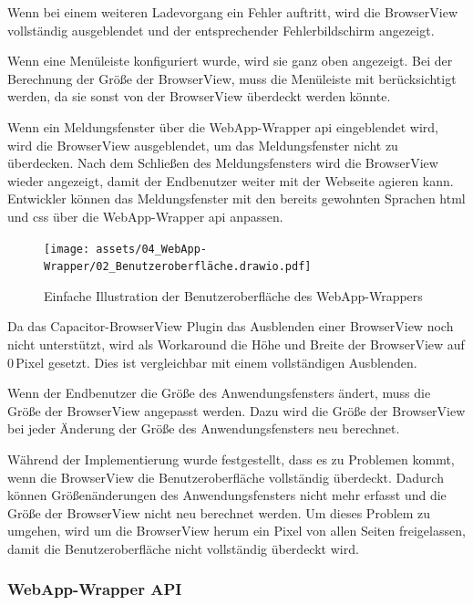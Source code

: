 Wenn bei einem weiteren Ladevorgang ein Fehler auftritt, wird die BrowserView vollständig ausgeblendet und der entsprechender Fehlerbildschirm angezeigt.

Wenn eine Menüleiste konfiguriert wurde, wird sie ganz oben angezeigt.
Bei der Berechnung der Größe der BrowserView, muss die Menüleiste mit berücksichtigt werden, da sie sonst von der BrowserView überdeckt werden könnte.

\newpage

Wenn ein Meldungsfenster über die WebApp-Wrapper \ac{api} eingeblendet wird, wird die BrowserView ausgeblendet, um das Meldungsfenster nicht zu überdecken.
Nach dem Schließen des Meldungsfensters wird die BrowserView wieder angezeigt, damit der Endbenutzer weiter mit der Webseite agieren kann.
Entwickler können das Meldungsfenster mit den bereits gewohnten Sprachen \ac{html} und \ac{css} über die WebApp-Wrapper \ac{api} anpassen.

\begin{figure}[H]
  \centering
  \texttt{[image: assets/04\_WebApp-Wrapper/02\_Benutzeroberfläche.drawio.pdf]}
  \caption[WebApp-Wrapper / Benutzeroberfläche]{Einfache Illustration der Benutzeroberfläche des WebApp-Wrappers}
\end{figure}

Da das Capacitor-BrowserView Plugin das Ausblenden einer BrowserView noch nicht unterstützt, wird als Workaround die Höhe und Breite der BrowserView auf 0\,Pixel gesetzt.
Dies ist vergleichbar mit einem vollständigen Ausblenden.

Wenn der Endbenutzer die Größe des Anwendungsfensters ändert, muss die Größe der BrowserView angepasst werden.
Dazu wird die Größe der BrowserView bei jeder Änderung der Größe des Anwendungsfensters neu berechnet.

Während der Implementierung wurde festgestellt, dass es zu Problemen kommt, wenn die BrowserView die Benutzeroberfläche vollständig überdeckt.
Dadurch können Größenänderungen des Anwendungsfensters nicht mehr erfasst und die Größe der BrowserView nicht neu berechnet werden.
Um dieses Problem zu umgehen, wird um die BrowserView herum ein Pixel von allen Seiten freigelassen, damit die Benutzeroberfläche nicht vollständig überdeckt wird.

\newpage

\subsubsection{WebApp-Wrapper API}

